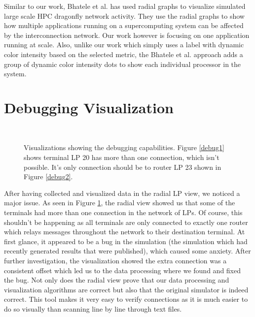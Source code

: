 \documentclass{acm_proc_article-sp}
\begin{document}
Similar to our work, Bhatele et al. \cite{DragonVis} has used radial graphs to visualize simulated large scale HPC dragonfly network activity. They use the radial graphs to show how multiple applications running on a supercomputing system can be affected by the interconnection network. Our work however is focusing on one application running at scale. Also, unlike our work which simply uses a label with dynamic color intensity based on the selected metric, the Bhatele et al. approach adds a group of dynamic color intensity dots to show each individual processor in the system. 

\section{Debugging Visualization}

\begin{figure}[!ht]
     \centering
     \\
          \caption{Visualizations showing the debugging capabilities. Figure \ref{debug1} shows terminal LP 20 has more than one connection, which isn't possible. It's only connection should be to router LP 23 shown in Figure \ref{debug2}. }
     \label{debug}
\end{figure}

After having collected and visualized data in the radial LP view, we noticed a major issue. As seen in Figure \ref{debug}, the radial view showed us that some of the terminals had more than one connection in the network of LPs. Of course, this shouldn't be happening as all terminals are only connected to exactly one router which relays messages throughout the network to their destination terminal. At first glance, it appeared to be a bug in the simulation (the simulation which had recently generated results that were published), which caused some anxiety. After further investigation, the visualization showed the extra connection was a consistent offset which led us to the data processing where we found and fixed the bug. Not only does the radial view prove that our data processing and visualization algorithms are correct but also that the original simulator is indeed correct. This tool makes it very easy to verify connections as it is much easier to do so visually than scanning line by line through text files.
\end{document}
